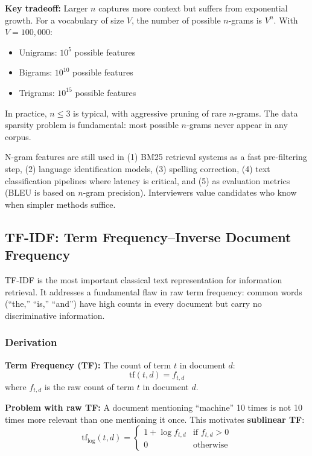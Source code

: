 \textbf{Key tradeoff:} Larger $n$ captures more context but suffers from exponential
growth. For a vocabulary of size $V$, the number of possible $n$-grams is $V^n$. With
$V = 100{,}000$:
\begin{itemize}
    \item Unigrams: $10^5$ possible features
    \item Bigrams: $10^{10}$ possible features
    \item Trigrams: $10^{15}$ possible features
\end{itemize}

In practice, $n \leq 3$ is typical, with aggressive pruning of rare $n$-grams. The data
sparsity problem is fundamental: most possible $n$-grams never appear in any corpus.

\begin{keyinsight}
N-gram features are still used in (1) BM25 retrieval systems as a fast pre-filtering step,
(2) language identification models, (3) spelling correction, (4) text classification
pipelines where latency is critical, and (5) as evaluation metrics (BLEU is based on
$n$-gram precision). Interviewers value candidates who know when simpler methods suffice.
\end{keyinsight}

\subsection{TF-IDF: Term Frequency--Inverse Document Frequency}
\label{sec:tfidf}

TF-IDF is the most important classical text representation for information retrieval.
It addresses a fundamental flaw in raw term frequency: common words (``the,'' ``is,''
``and'') have high counts in every document but carry no discriminative information.

\subsubsection{Derivation}

\textbf{Term Frequency (TF):} The count of term $t$ in document $d$:
\begin{equation}
    \text{tf}(t, d) = f_{t,d}
    \label{eq:tf_raw}
\end{equation}
where $f_{t,d}$ is the raw count of term $t$ in document $d$.

\textbf{Problem with raw TF:} A document mentioning ``machine'' 10 times is not 10 times
more relevant than one mentioning it once. This motivates \textbf{sublinear TF}:
\begin{equation}
    \text{tf}_{\log}(t, d) = \begin{cases} 1 + \log f_{t,d} & \text{if } f_{t,d} > 0 \\ 0 & \text{otherwise} \end{cases}
    \label{eq:tf_sublinear}
\end{equation}

